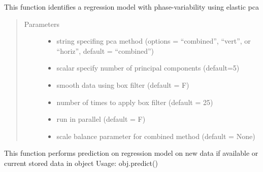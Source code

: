 \documentclass[letterpaper,10pt,english]{sphinxmanual}
\begin{document}
\begin{fulllineitems}
\begin{fulllineitems}
\label{\detokenize{pcr_regression:pcr_regression.elastic_pcr_regression.calc_model}}
This function identifies a regression model with phase-variability
using elastic pca
\begin{quote}\begin{description}
\item[{Parameters}] \leavevmode\begin{itemize}
\item {} 
 \textendash{} string specifing pca method (options = “combined”,
“vert”, or “horiz”, default = “combined”)

\item {} 
 \textendash{} scalar specify number of principal components (default=5)

\item {} 
 \textendash{} smooth data using box filter (default = F)

\item {} 
 \textendash{} number of times to apply box filter (default = 25)

\item {} 
 \textendash{} run in parallel (default = F)

\item {} 
 \textendash{} scale balance parameter for combined method (default = None)

\end{itemize}

\end{description}\end{quote}

\end{fulllineitems}


\begin{fulllineitems}
\label{\detokenize{pcr_regression:pcr_regression.elastic_pcr_regression.predict}}
This function performs prediction on regression model on new data if available or current stored data in object
Usage:  obj.predict()
\begin{quote}


\end{quote}
\end{fulllineitems}
\end{fulllineitems}
\end{document}
